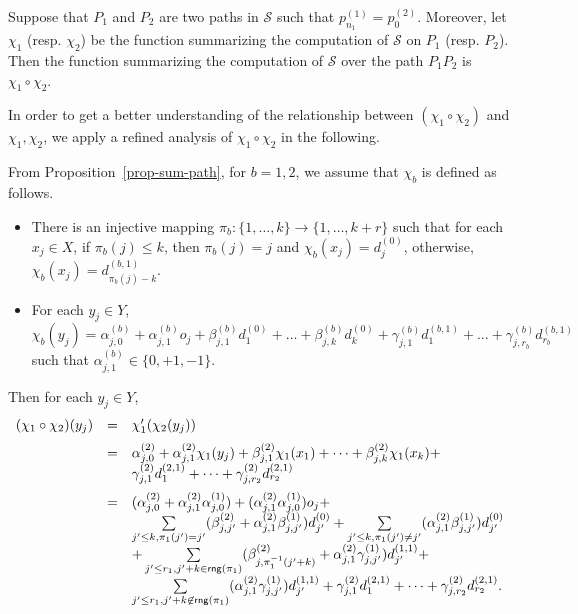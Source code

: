 \documentclass[runningheads,a4paper]{llncs}
\def\Ss{{\mathcal{S} }}
\newcommand\rng{\mathsf{rng}}
\begin{document}
\begin{corollary}\label{cor-comp-two-paths}
Suppose that $P_1$ and $P_2$ are two paths in $\Ss$ such that $p^{(1)}_{n_1}=p^{(2)}_0$. Moreover, let $\chi_1$ (resp. $\chi_2$) be the function summarizing the computation of $\Ss$ on $P_1$ (resp. $P_2$). Then the function summarizing the computation of $\Ss$ over the path $P_1 P_2$ is $\chi_1 \circ \chi_2$.
\end{corollary}

In order to get a better understanding of the relationship between $(\chi_1 \circ \chi_2)$ and $\chi_1,\chi_2$, we apply a refined analysis of $\chi_1 \circ \chi_2$ in the following. 

From Proposition~\ref{prop-sum-path}, for $b=1,2$, we assume that $\chi_b$ is defined as follows.
\begin{itemize}
\item There is an injective mapping $\pi_b: \{1,\dots,k\} \rightarrow \{1,\dots, k+r\}$ such that for each $x_j \in X$, if $\pi_b(j) \le k$, then $\pi_b(j)=j$ and $\chi_b(x_j)=d^{(0)}_{j}$, otherwise, $\chi_b(x_j)=d^{(b,1)}_{\pi_b(j)-k}$.
% 
\item For each $y_j \in Y$, $\chi_b(y_j) = \alpha^{(b)}_{j,0} + \alpha^{(b)}_{j,1} o_j + \beta^{(b)}_{j,1} d^{(0)}_1 + \dots + \beta^{(b)}_{j,k} d^{(0)}_k + \gamma^{(b)}_{j,1} d^{(b,1)}_1 +\dots + \gamma^{(b)}_{j,r_b} d^{(b,1)}_{r_b}$ such that $\alpha^{(b)}_{j,1} \in \{0,+1,-1\}$.
\end{itemize}

Then
for each $y_j \in Y$,
\[
\begin{array}{l c l}
\medskip
(\chi_1 \circ \chi_2)(y_j) & = & \chi'_1(\chi_2(y_j))\\
%
& = &  \alpha^{(2)}_{j,0} + \alpha^{(2)}_{j,1} \chi_1(y_j) + \beta^{(2)}_{j,1} \chi_1(x_1) + \dots + \beta^{(2)}_{j,k} \chi_1(x_k) +\\
\medskip
& & \gamma^{(2)}_{j,1} d^{(2,1)}_1 +\dots + \gamma^{(2)}_{j,r_2} d^{(2,1)}_{r_2} \\
%
& =  & (\alpha^{(2)}_{j,0}+\alpha^{(2)}_{j,1} \alpha^{(1)}_{j,0})+ (\alpha^{(2)}_{j,1}\alpha^{(1)}_{j,0}) o_j + \\
%
& & \sum \limits_{j' \le k, \pi_1(j')=j'} (\beta^{(2)}_{j,j'}+\alpha^{(2)}_{j,1} \beta^{(1)}_{j,j'}) d^{(0)}_{j'} + \sum \limits_{j' \le k, \pi_1(j') \neq j'} (\alpha^{(2)}_{j,1} \beta^{(1)}_{j,j'}) d^{(0)}_{j'}  \\
%
& & + \sum \limits_{j' \le r_1, j' + k \in \rng(\pi_1)} (\beta^{(2)}_{j,\pi_1^{-1}(j'+k)}+\alpha^{(2)}_{j,1} \gamma^{(1)}_{j,j'}) d^{(1,1)}_{j'} +\\
%
& & \sum \limits_{j' \le r_1, j' + k \not \in \rng(\pi_1)} (\alpha^{(2)}_{j,1} \gamma^{(1)}_{j,j'}) d^{(1,1)}_{j'} + 
 \gamma^{(2)}_{j,1} d^{(2,1)}_1 +\dots + \gamma^{(2)}_{j,r_2} d^{(2,1)}_{r_2}.
\end{array}
\] 
\end{document}
